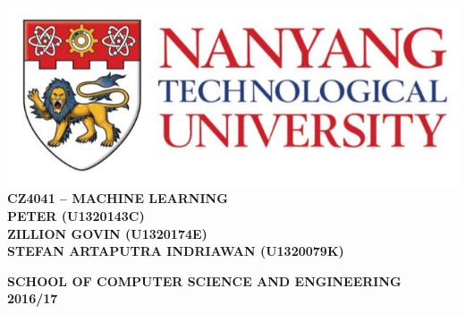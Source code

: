 \begin{titlepage}
	\begin{center}
		
		\includegraphics[width=1\textwidth]{./ntu_logo.png}
		\\[5cm]
		
		\uppercase{\textbf{CZ4041 -- MACHINE LEARNING}}
		\\[5cm]
		
		\uppercase{
			\textbf{
				PETER (U1320143C)
				\\
				ZILLION GOVIN (U1320174E)
				\\
				STEFAN ARTAPUTRA INDRIAWAN (U1320079K)
		}}	
		
		\vfill
		
		\textsc{\bfseries SCHOOL OF COMPUTER SCIENCE AND ENGINEERING}
		\\
		\textbf{2016/17}
		
	\end{center}
\end{titlepage}